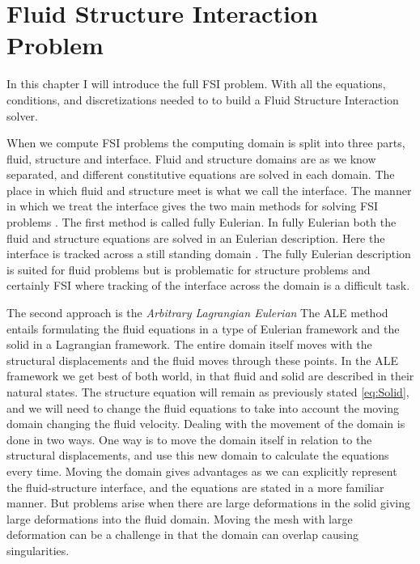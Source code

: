 \chapter{Fluid Structure Interaction Problem}
In this chapter I will introduce the full FSI problem. With all the equations, conditions, and discretizations needed to to build a Fluid Structure Interaction solver. \newline

When we compute FSI problems the computing domain is split into three parts, fluid, structure and interface. Fluid and structure domains are as we know separated, and different constitutive equations are solved in each domain. The place in which fluid and structure meet is what we call the interface. The manner in which we treat the interface gives the two main methods for solving FSI problems \cite{Liu2014}. The first method is called fully Eulerian. In fully Eulerian both the fluid and structure equations are solved in an Eulerian description. Here the interface is tracked across a still standing domain \cite{Valkov2015}. The fully Eulerian description is suited for fluid problems but is problematic for structure problems and certainly FSI where tracking of the interface across the domain is a difficult task. \newline

The second approach is the \textit{Arbitrary Lagrangian Eulerian}
The ALE method entails formulating the fluid equations in a type of Eulerian framework and the solid in a Lagrangian framework. The entire domain itself moves with the structural displacements and the fluid moves through these points. In the ALE framework we get best of both world, in that fluid and solid are described in their natural states. The structure equation will remain as previously stated \eqref{eq:Solid}, and we will need to change the fluid equations to take into account the moving domain changing the fluid velocity. Dealing with the movement of the domain is done in two ways. One way is to move the domain itself in relation to the structural displacements, and use this new domain to calculate the equations every time.
Moving the domain gives advantages as we can explicitly represent the fluid-structure interface, and the equations are stated in a more familiar manner. But problems arise when there are large deformations in the solid giving large deformations into the fluid domain. Moving the mesh with large deformation can be a challenge in that the domain can overlap causing singularities. \newline


